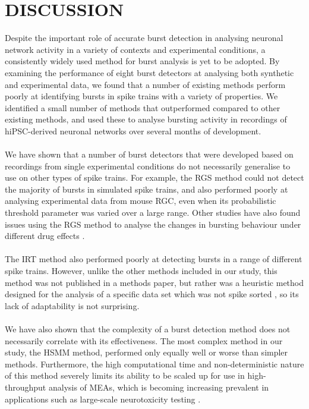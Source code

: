 \documentclass[12pt, titlepage]{article}
\begin{document}
	\section*{DISCUSSION}
	Despite the important role of accurate burst detection in analysing neuronal network activity in a variety of contexts and experimental conditions, a consistently widely used method for burst analysis is yet to be adopted. By examining the performance of eight burst detectors at analysing both synthetic and experimental data, we found that a number of existing methods perform poorly at identifying bursts in spike trains with a variety of properties. We identified a small number of methods that outperformed compared to other existing methods, and used these to analyse bursting activity in recordings of hiPSC-derived neuronal networks over several months of development.
	\\ \\We have shown that a number of burst detectors that were developed based on recordings from single experimental conditions do not necessarily generalise to use on other types of spike trains. For example, the RGS method could not detect the majority of bursts in simulated spike trains, and also performed poorly at analysing experimental data from mouse RGC, even when its probabilistic threshold parameter was varied over a large range. Other studies have also found issues using the RGS method to analyse the changes in bursting behaviour under different drug effects \cite{Eisenman2015}. 
	\\ \\The IRT method also performed poorly at detecting bursts in a range of different spike trains. However, unlike the other methods included in our study, this method was not published in a methods paper, but rather was a heuristic method designed for the analysis of a specific data set which was not spike sorted \cite{Hennig2011}, so its lack of adaptability is not surprising.
	\\ \\We have also shown that the complexity of a burst detection method does not necessarily correlate with its effectiveness. The most complex method in our study, the HSMM method, performed only equally well or worse than simpler methods. Furthermore, the high computational time and non-deterministic nature of this method severely limits its ability to be scaled up for use in high-throughput analysis of MEAs, which is becoming increasing prevalent in applications such as large-scale neurotoxicity testing \cite{Nicolas2014}.
\end{document}
